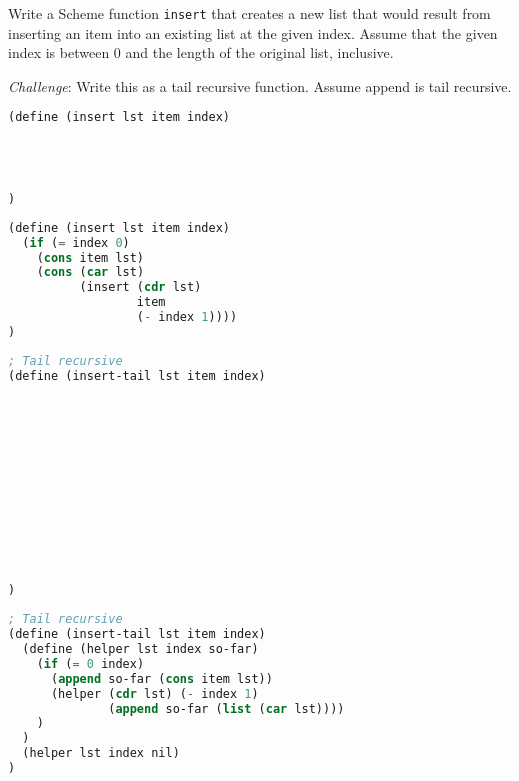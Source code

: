 \question Write a Scheme function \texttt{insert} that creates a new list that would result from inserting an item into an existing list at the given index.
Assume that the given index is between 0 and the length of the original list, inclusive.

\emph{Challenge}: Write this as a tail recursive function. Assume append is tail recursive.
\begin{blocksection}
\begin{lstlisting}[language=Scheme]
(define (insert lst item index)




)
\end{lstlisting}

\begin{solution}[0.5in]
\begin{lstlisting}[language=Scheme]
(define (insert lst item index)
  (if (= index 0)
    (cons item lst)
    (cons (car lst) 
          (insert (cdr lst) 
                  item 
                  (- index 1))))
)
\end{lstlisting}
\end{solution}
\end{blocksection}

\begin{blocksection}

\begin{lstlisting}[language=Scheme]
; Tail recursive
(define (insert-tail lst item index)












)
\end{lstlisting}

\begin{solution}
\begin{lstlisting}[language=Scheme]
; Tail recursive
(define (insert-tail lst item index)
  (define (helper lst index so-far)
    (if (= 0 index)
      (append so-far (cons item lst))
      (helper (cdr lst) (- index 1)
              (append so-far (list (car lst))))
    )
  )
  (helper lst index nil)
)
\end{lstlisting}
\end{solution}
\end{blocksection}

